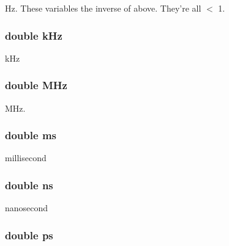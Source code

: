 Hz. These variables the inverse of above. They're all $<$ 1. \hypertarget{namespaceSimClock_1_1Float_ab2e340334239e07b45475bf2b578bd1d}{
\subsubsection[{kHz}]{\setlength{\rightskip}{0pt plus 5cm}double {\bf kHz}}}
\label{namespaceSimClock_1_1Float_ab2e340334239e07b45475bf2b578bd1d}


kHz \hypertarget{namespaceSimClock_1_1Float_a7a6d6f8f8fab330c0cc34994ece36b64}{
\subsubsection[{MHz}]{\setlength{\rightskip}{0pt plus 5cm}double {\bf MHz}}}
\label{namespaceSimClock_1_1Float_a7a6d6f8f8fab330c0cc34994ece36b64}


MHz. \hypertarget{namespaceSimClock_1_1Float_ac0c30c1e98c242e3e868c424886912e5}{
\subsubsection[{ms}]{\setlength{\rightskip}{0pt plus 5cm}double {\bf ms}}}
\label{namespaceSimClock_1_1Float_ac0c30c1e98c242e3e868c424886912e5}


millisecond \hypertarget{namespaceSimClock_1_1Float_a476bed566643072ee0ed28f78d0db370}{
\subsubsection[{ns}]{\setlength{\rightskip}{0pt plus 5cm}double {\bf ns}}}
\label{namespaceSimClock_1_1Float_a476bed566643072ee0ed28f78d0db370}


nanosecond \hypertarget{namespaceSimClock_1_1Float_a2b58822b2dc20f33784218fa3dd7f7e5}{
\subsubsection[{ps}]{\setlength{\rightskip}{0pt plus 5cm}double {\bf ps}}}
\label{namespaceSimClock_1_1Float_a2b58822b2dc20f33784218fa3dd7f7e5}


